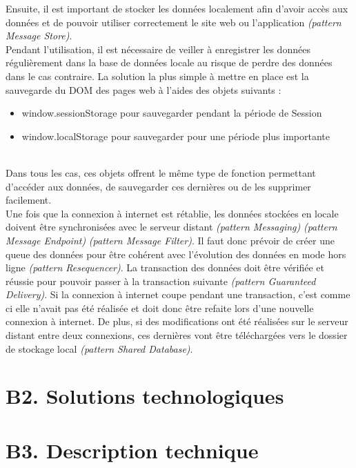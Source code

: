 	Ensuite, il est important de stocker les données localement afin d’avoir accès aux données et de pouvoir utiliser correctement le site web ou l’application \textit{(pattern Message Store)}. \\

	Pendant l’utilisation, il est nécessaire de veiller à enregistrer les données régulièrement dans la base de données locale au risque de perdre des données dans le cas contraire. La solution la plus simple à mettre en place est la sauvegarde du DOM des pages web à l’aides des objets suivants :

	\begin{itemize}
		\item window.sessionStorage pour sauvegarder pendant la période de Session
		\item window.localStorage pour sauvegarder pour une période plus importante
	\end{itemize}
	~\\

	Dans tous les cas, ces objets offrent le même type de fonction permettant d'accéder aux données, de sauvegarder ces dernières ou de les supprimer facilement.\\

	Une fois que la connexion à internet est rétablie, les données stockées en locale doivent être synchronisées avec le serveur distant \textit{(pattern Messaging)} \textit{(pattern Message Endpoint)} \textit{(pattern Message Filter)}. Il faut donc prévoir de créer une queue des données pour être cohérent avec l’évolution des données en mode hors ligne \textit{(pattern Resequencer)}. La transaction des données doit être vérifiée et réussie pour pouvoir passer à la transaction suivante \textit{(pattern Guaranteed Delivery)}. Si la connexion à internet coupe pendant une transaction, c’est comme ci elle n’avait pas été réalisée et doit donc être refaite lors d’une nouvelle connexion à internet. De plus, si des modifications ont été réalisées sur le serveur distant entre deux connexions, ces dernières vont être téléchargées vers le dossier de stockage local \textit{(pattern Shared Database)}.

\section{B2. Solutions technologiques}

\section{B3. Description technique}

